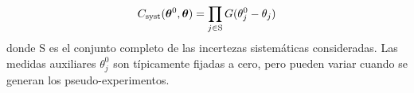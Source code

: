 \begin{equation}
  C_\text{syst} (\bm{\theta}^0, \bm{\theta}) = \prod_{j \in \text{S}} G(\theta_j^0 - \theta_j)
\end{equation}
%
donde S es el conjunto completo de las incertezas sistemáticas consideradas.
Las medidas auxiliares $\theta^0_j$ son típicamente fijadas a cero, pero pueden
variar cuando se generan los pseudo-experimentos.










